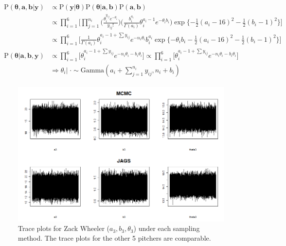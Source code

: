 \documentclass{article}
\begin{document}
\begin{align}
    \begin{split}
        \text{P}(\boldsymbol{\theta}, \mathbf{a}, \mathbf{b} | \mathbf{y}) &\propto \text{P}(\mathbf{y} | \boldsymbol{\theta}) \text{P}(\boldsymbol{\theta}|\mathbf{a},\mathbf{b})\text{P}(\mathbf{a},\mathbf{b}) 
        \\
        &\propto \prod_{i=1}^6 \Big[\prod_{j=1}^{n_i} \big( \frac{\theta_i^{y_{ij}}e^{-\theta_i}}{y_{ij}!} \big) \big( \frac{b_i^{a_i}}{\Gamma(a_i)} \theta_i^{a_i-1}e^{-\theta_ib_i} \big) \exp\{-\frac{1}{2}(a_i-16)^2-\frac{1}{2}(b_i-1)^2 \} \Big] 
        \\
        &\propto \prod_{i=1}^6 \Big[ \frac{1}{\Gamma(a_i)} \theta_i^{a_i-1+\sum y_{ij}} e^{-n_i \theta_i} b_i^{a_i} \exp \{ -\theta_i b_i - \frac{1}{2}(a_i-16)^2 - \frac{1}{2}(b_i-1)^2 \} \Big]
        \\
        \text{P}(\boldsymbol{\theta} | \mathbf{a}, \mathbf{b}, \mathbf{y}) &\propto \prod_{i=1}^6 \Big[ \theta_i^{a_i-1+\sum y_{ij}} e^{-n_i \theta_i - b_i \theta_i} \Big] \propto \prod_{i=1}^6 \Big[ \theta_i^{a_i-1+\sum y_{ij}} e^{-n_i \theta_i - b_i \theta_i} \Big]
        \\
        &\Longrightarrow \theta_i | \; \cdot \sim \text{Gamma}(a_i + \sum_{j=1}^{n_i} y_{ij}, n_i+b_i)
        \label{eq:cond-theta}
    \end{split}
\end{align}

\begin{figure}[h]
    \centering
    \includegraphics[scale=0.5]{figs/trace.png}
    \caption{Trace plots for Zack Wheeler ($a_3, b_3, \theta_3$) under each sampling method. The trace plots for the other 5 pitchers are comparable.}
    \label{fig:trace}
\end{figure}
\end{document}
